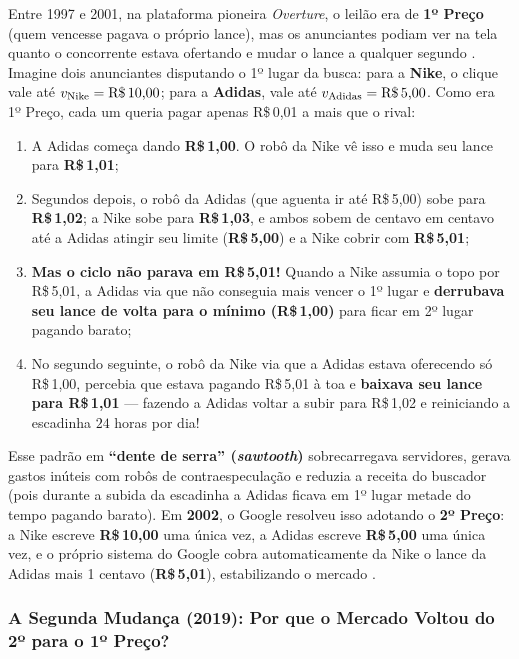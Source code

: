 Entre 1997 e 2001, na plataforma pioneira \textit{Overture}, o leilão era de \textbf{1º Preço} (quem vencesse pagava o próprio lance), mas os anunciantes podiam ver na tela quanto o concorrente estava ofertando e mudar o lance a qualquer segundo \cite[p.~245--246]{edelman2007}. Imagine dois anunciantes disputando o 1º lugar da busca: para a \textbf{Nike}, o clique vale até $v_{\text{Nike}} = \text{R\$\,10,00}$; para a \textbf{Adidas}, vale até $v_{\text{Adidas}} = \text{R\$\,5,00}$. Como era 1º Preço, cada um queria pagar apenas R\$\,0,01 a mais que o rival:
\begin{enumerate}[label=\arabic*.]
    \item A Adidas começa dando \textbf{R\$\,1,00}. O robô da Nike vê isso e muda seu lance para \textbf{R\$\,1,01};
    \item Segundos depois, o robô da Adidas (que aguenta ir até R\$\,5,00) sobe para \textbf{R\$\,1,02}; a Nike sobe para \textbf{R\$\,1,03}, e ambos sobem de centavo em centavo até a Adidas atingir seu limite (\textbf{R\$\,5,00}) e a Nike cobrir com \textbf{R\$\,5,01};
    \item \textbf{Mas o ciclo não parava em R\$\,5,01!} Quando a Nike assumia o topo por R\$\,5,01, a Adidas via que não conseguia mais vencer o 1º lugar e \textbf{derrubava seu lance de volta para o mínimo (R\$\,1,00)} para ficar em 2º lugar pagando barato;
    \item No segundo seguinte, o robô da Nike via que a Adidas estava oferecendo só R\$\,1,00, percebia que estava pagando R\$\,5,01 à toa e \textbf{baixava seu lance para R\$\,1,01} --- fazendo a Adidas voltar a subir para R\$\,1,02 e reiniciando a escadinha $24$ horas por dia!
\end{enumerate}

Esse padrão em \textbf{``dente de serra'' (\textit{sawtooth})} sobrecarregava servidores, gerava gastos inúteis com robôs de contraespeculação \cite[p.~20]{vickrey1961} e reduzia a receita do buscador (pois durante a subida da escadinha a Adidas ficava em 1º lugar metade do tempo pagando barato). Em \textbf{2002}, o Google resolveu isso adotando o \textbf{2º Preço}: a Nike escreve \textbf{R\$\,10,00} uma única vez, a Adidas escreve \textbf{R\$\,5,00} uma única vez, e o próprio sistema do Google cobra automaticamente da Nike o lance da Adidas mais 1 centavo (\textbf{R\$\,5,01}), estabilizando o mercado \cite[p.~246]{edelman2007}.

\subsubsection{A Segunda Mudança (2019): Por que o Mercado Voltou do 2º para o 1º Preço?}

